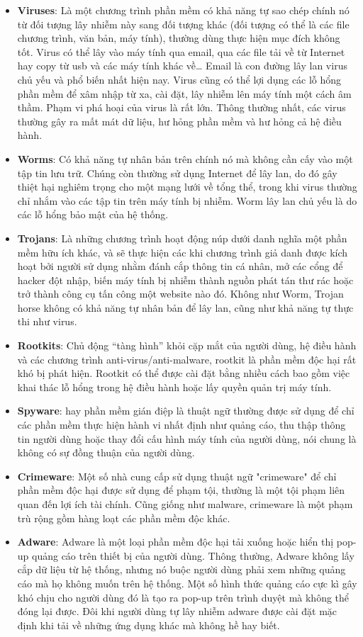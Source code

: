 \begin{itemize}
    \item \textbf{Viruses}: Là một chương trình phần mềm có khả năng tự sao chép chính nó từ đối tượng lây nhiễm này sang đối tượng khác (đối tượng có thể là các file chương trình, văn bản, máy tính), thường dùng thực hiện mục đích không tốt. Virus có thể lây vào máy tính qua email, qua các file tải về từ Internet hay copy từ usb và các máy tính khác về… Email là con đường lây lan virus chủ yếu và phổ biến nhất hiện nay. Virus cũng có thể lợi dụng các lỗ hổng phần mềm để xâm nhập từ xa, cài đặt, lây nhiễm lên máy tính một cách âm thầm. Phạm vi phá hoại của virus là rất lớn. Thông thường nhất, các virus thường gây ra mất mát dữ liệu, hư hỏng phần mềm và hư hỏng cả hệ điều hành.
    \item \textbf{Worms}: Có khả năng tự nhân bản trên chính nó mà không cần cấy vào một tập tin lưu trữ. Chúng còn thường sử dụng Internet để lây lan, do đó gây thiệt hại nghiêm trọng cho một mạng lưới về tổng thể, trong khi virus thường chỉ nhắm vào các tập tin trên máy tính bị nhiễm. Worm lây lan chủ yếu là do các lỗ hổng bảo mật của hệ thống. 
    \item \textbf{Trojans}: Là những chương trình hoạt động núp dưới danh nghĩa một phần mềm hữu ích khác, và sẽ thực hiện các khi chương trình giả danh được kích hoạt bởi người sử dụng nhằm đánh cắp thông tin cá nhân, mở các cổng để hacker đột nhập, biến máy tính bị nhiễm thành nguồn phát tán thư rác hoặc trở thành công cụ tấn công một website nào đó. Không như Worm, Trojan horse không có khả năng tự nhân bản để lây lan, cũng như khả năng tự thực thi như virus.
    \item \textbf{Rootkits}: Chủ động “tàng hình” khỏi cặp mắt của người dùng, hệ điều hành và các chương trình anti-virus/anti-malware, rootkit là phần mềm độc hại rất khó bị phát hiện. Rootkit có thể được cài đặt bằng nhiều cách bao gồm việc khai thác lỗ hổng trong hệ điều hành hoặc lấy quyền quản trị máy tính.
    \item \textbf{Spyware}: hay phần mềm gián điệp là thuật ngữ thường được sử dụng để chỉ các phần mềm thực hiện hành vi nhất định như quảng cáo, thu thập thông tin người dùng hoặc thay đổi cấu hình máy tính của người dùng, nói chung là không có sự đồng thuận của người dùng.
    \item \textbf{Crimeware}: Một số nhà cung cấp sử dụng thuật ngữ "crimeware" để chỉ phần mềm độc hại được sử dụng để phạm tội, thường là một tội phạm liên quan đến lợi ích tài chính. Cũng giống như malware, crimeware là một phạm trù rộng gồm hàng loạt các phần mềm độc khác.
    \item \textbf{Adware}: Adware là một loại phần mềm độc hại tải xuống hoặc hiển thị pop-up quảng cáo trên thiết bị của người dùng. Thông thường, Adware không lấy cắp dữ liệu từ hệ thống, nhưng nó buộc người dùng phải xem những quảng cáo mà họ không muốn trên hệ thống. Một số hình thức quảng cáo cực kì gây khó chịu cho người dùng đó là tạo ra pop-up trên trình duyệt mà không thể đóng lại được. Đôi khi người dùng tự lây nhiễm adware được cài đặt mặc định khi tải về những ứng dụng khác mà không hề hay biết.
\end{itemize}
